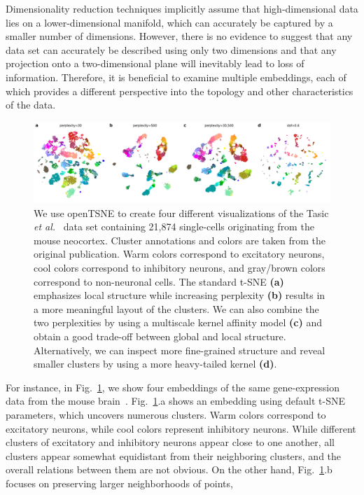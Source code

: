 \documentclass[twocolumn]{bmcart}
\begin{document}
Dimensionality reduction techniques implicitly assume that high-dimensional
data lies on a lower-dimensional manifold, which can accurately be captured by
a smaller number of dimensions. However, there is no evidence to suggest that
any data set can accurately be described using only two dimensions and that any
projection onto a two-dimensional plane will inevitably lead to loss of
information. Therefore, it is beneficial to examine multiple embeddings, each
of which provides a different perspective into the topology and other
characteristics of the data.  \begin{figure}[htbp]
	\includegraphics[width=\textwidth]{tasic2018}
	\caption{\label{fig:tasic}We use openTSNE to create four different
	visualizations of the Tasic \textit{et al.}~\cite{tasic2018shared} data
	set containing 21,874 single-cells originating from the mouse
	neocortex. Cluster annotations and colors are taken from the original
	publication. Warm colors correspond to excitatory neurons, cool colors
	correspond to inhibitory neurons, and gray/brown colors correspond to
	non-neuronal cells. The standard t-SNE \textbf{(a)} emphasizes local
	structure while increasing perplexity \textbf{(b)} results in a more
	meaningful layout of the clusters. We can also combine the two
	perplexities by using a multiscale kernel affinity model \textbf{(c)}
	and obtain a good trade-off between global and local structure.
	Alternatively, we can inspect more fine-grained structure and reveal
	smaller clusters by using a more heavy-tailed kernel \textbf{(d)}.}
\end{figure} For instance, in Fig.~\ref{fig:tasic}, we show four embeddings of
the same gene-expression data from the mouse brain~\cite{tasic2018shared}.
Fig.~\ref{fig:tasic}.a shows an embedding using default t-SNE parameters, which
uncovers numerous clusters. Warm colors correspond to excitatory neurons, while
cool colors represent inhibitory neurons. While different clusters of
excitatory and inhibitory neurons appear close to one another, all clusters
appear somewhat equidistant from their neighboring clusters, and the overall
relations between them are not obvious. On the other hand,
Fig.~\ref{fig:tasic}.b focuses on preserving larger neighborhoods of points,
\end{document}
